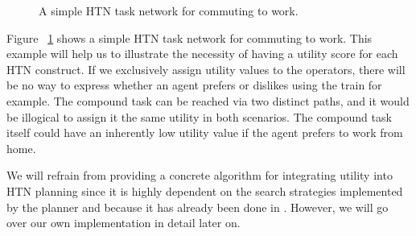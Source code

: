 \begin{figure}[H]
    \centering
    \caption{A simple HTN task network for commuting to work.}
    \label{fig:commute_to_work}
\end{figure}
Figure ~\ref{fig:commute_to_work} shows a simple HTN task network for commuting to work. This example will help us to illustrate the necessity of having a utility score for each HTN construct. If we exclusively assign utility values to the operators, there will be no way to express whether an agent prefers or dislikes using the train for example. The compound task  can be reached via two distinct paths, and it would be illogical to assign it the same utility in both scenarios. The compound task  itself could have an inherently low utility value if the agent prefers to work from home.

We will refrain from providing a concrete algorithm for integrating utility into HTN planning since it is highly dependent on the search strategies implemented by the planner and because it has already been done in \cite{alnazer2019htn} \cite{georgievski2014utility} \cite{alnazer2022risk}. However, we will go over our own implementation in detail later on.


